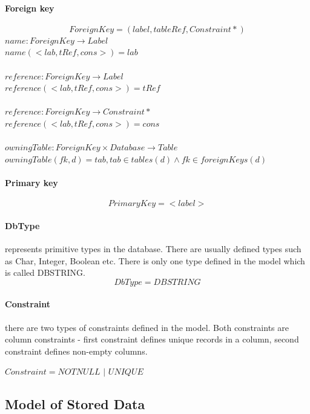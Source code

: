 \documentclass[11pt]{article}
\begin{document}
\paragraph{Foreign key}
$$
ForeignKey = (label, tableRef, Constraint*)
$$
$name : ForeignKey \rightarrow Label $ \\
$name(< lab, tRef, cons  >) = lab $ \\ \\
$reference : ForeignKey \rightarrow Label $ \\
$reference(< lab, tRef, cons  >) = tRef $ \\ \\
$reference : ForeignKey \rightarrow Constraint* $ \\
$reference(< lab, tRef, cons  >) = cons $ \\ \\
$owningTable : ForeignKey \times Database \rightarrow Table $ \\
$owningTable(fk, d) = tab, tab \in tables(d) \wedge fk \in foreignKeys(d) $

\paragraph{Primary key}
$$
PrimaryKey =  < label > 	
$$

\paragraph{DbType} represents primitive types in the database. There are usually defined types such as Char, Integer, Boolean etc. There is only one type defined in the model which is called DBSTRING.
$$
DbType = DBSTRING
$$

\paragraph{Constraint} there are two types of constraints defined in the model. Both constraints are column constraints - first constraint defines unique records in a column, second constraint defines non-empty columns.

\begin{center}
$Constraint = NOTNULL$ $|$ $UNIQUE $
\end{center}

\subsection{Model of Stored Data}
\end{document}
